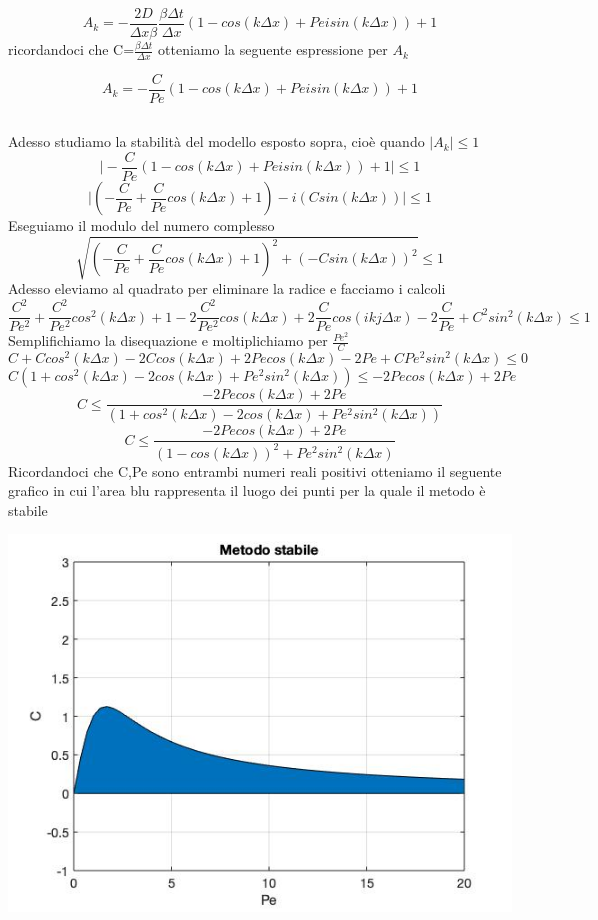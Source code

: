 \documentclass[]{article}
\begin{document}
$$A_k=-\frac{2D}{\Delta x \beta}\frac{\beta \Delta t}{\Delta x}(1-cos(k\Delta x)+Pe i sin(k\Delta x))+1$$
ricordandoci che C=$\frac{\beta \Delta t}{\Delta x}$ otteniamo la seguente espressione per $A_k$

$$A_k=-\frac{C}{Pe}(1-cos(k\Delta x)+Pe i sin(k\Delta x))+1$$





\subsection{}
Adesso studiamo la stabilità del modello esposto sopra, cioè quando $\vert A_k \vert \leq 1$
$$\vert-\frac{C}{Pe}(1-cos(k\Delta x)+Pe i sin(k\Delta x))+1\vert\leq 1$$
$$\vert(-\frac{C}{Pe}+\frac{C}{Pe}cos(k\Delta x)+1)- i (Csin(k\Delta x))\vert\leq 1$$
Eseguiamo il modulo del numero complesso
$$\sqrt{(-\frac{C}{Pe}+\frac{C}{Pe}cos(k\Delta x)+1)^{2}+ (-Csin(k\Delta x))^{2} }\leq 1$$
Adesso eleviamo al quadrato per eliminare la radice e facciamo i calcoli
$$\frac{C^{2}}{Pe^{2}}+\frac{C^{2}}{Pe^{2}}cos^{2}(k\Delta x)+1-2\frac{C^{2}}{Pe^{2}}cos(k\Delta x)+2\frac{C}{Pe}cos(ik j\Delta x)-2\frac{C}{Pe}+C^{2}sin^{2}(k\Delta x)\leq 1$$
Semplifichiamo la disequazione e moltiplichiamo per $\frac{Pe^{2}}{C}$
$$C+Ccos^{2}(k\Delta x)-2Ccos(k\Delta x)+2Pecos(k\Delta x)-2Pe+CPe^{2}sin^{2}(k\Delta x)\leq 0$$
$$C(1+cos^{2}(k\Delta x)-2cos(k\Delta x)+Pe^{2}sin^{2}(k\Delta x))\leq-2Pecos(k\Delta x)+2Pe $$
$$C\leq\frac{-2Pecos(k\Delta x)+2Pe}{(1+cos^{2}(k\Delta x)-2cos(k\Delta x)+Pe^{2}sin^{2}(k\Delta x))} $$
$$C\leq\frac{-2Pecos(k\Delta x)+2Pe}{(1-cos(k\Delta x))^{2}+Pe^{2}sin^{2}(k\Delta x)} $$
Ricordandoci che C,Pe sono entrambi numeri reali positivi otteniamo il seguente grafico in cui l'area blu rappresenta il luogo dei punti per la quale il metodo è stabile



\begin{center}
\includegraphics[width=0.95\linewidth]{stabilita1.jpg}
\\

\end{center}
\end{document}
